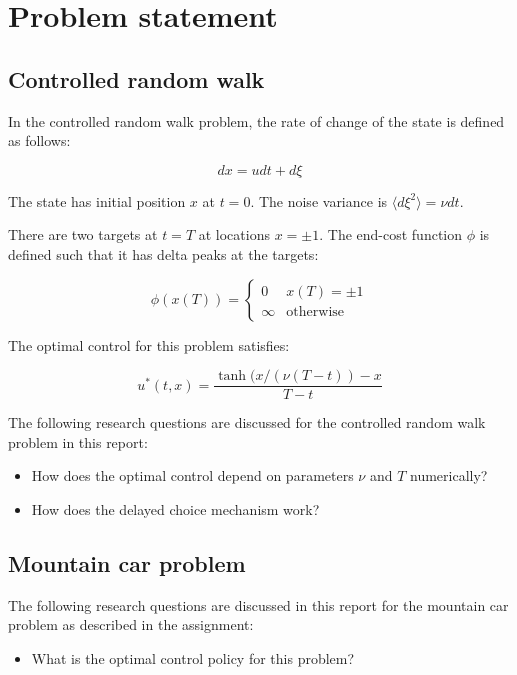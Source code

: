 \documentclass[10pt,a4paper]{article}
\begin{document}
\section{Problem statement}
\subsection{Controlled random walk}
In the controlled random walk problem, the rate of change of the state is defined as follows:

\begin{equation}
dx = u dt + d\xi
\label{eq:crw_dx}
\end{equation}

The state has initial position $x$ at $t = 0$. The noise variance is $\langle d \xi^2 \rangle = \nu dt$.

There are two targets at $t = T$ at locations $x = \pm 1$. The end-cost function $\phi$ is defined such that it has delta peaks at the targets:

\begin{equation}
\phi(x(T)) = \begin{cases}
0 & x(T) = \pm 1\\
\infty & \mbox{otherwise}
\end{cases}
\label{eq:crw_phi}
\end{equation}

The optimal control for this problem satisfies:

\begin{equation}
u^{*}(t, x) = \frac{\tanh(x / (\nu (T - t)) - x}{T - t}
\label{eq:crw_u}
\end{equation}

The following research questions are discussed for the controlled random walk problem in this report:
\begin{itemize}
\item How does the optimal control depend on parameters $\nu$ and $T$ numerically?
\item How does the delayed choice mechanism work?
\end{itemize}

\subsection{Mountain car problem}
The following research questions are discussed in this report for the mountain car problem as described in the assignment:
\begin{itemize}
\item What is the optimal control policy for this problem?
\end{itemize}
\end{document}
